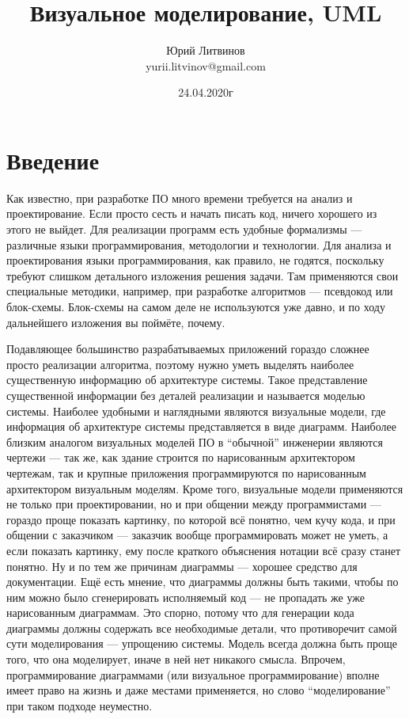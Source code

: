 \documentclass[a5paper]{article}
\title{Визуальное моделирование, UML}
\author{Юрий Литвинов\\\small{yurii.litvinov@gmail.com}}
\date{24.04.2020г}
\begin{document}
\maketitle
\thispagestyle{empty}

\section{Введение}

Как известно, при разработке ПО много времени требуется на анализ и проектирование. Если просто сесть и начать писать код, ничего хорошего из этого не выйдет. Для реализации программ есть удобные формализмы --- различные языки программирования, методологии и технологии. Для анализа и проектирования языки программирования, как правило, не годятся, поскольку требуют слишком детального изложения решения задачи. Там применяются свои специальные методики, например, при разработке алгоритмов --- псевдокод или блок-схемы. Блок-схемы на самом деле не используются уже давно, и по ходу дальнейшего изложения вы поймёте, почему.

Подавляющее большинство разрабатываемых приложений гораздо сложнее просто реализации алгоритма, поэтому нужно уметь выделять наиболее существенную информацию об архитектуре системы. Такое представление существенной информации без деталей реализации и называется моделью системы. Наиболее удобными и наглядными являются визуальные модели, где информация об архитектуре системы представляется в виде диаграмм. Наиболее близким аналогом визуальных моделей ПО в ``обычной'' инженерии являются чертежи --- так же, как здание строится по нарисованным архитектором чертежам, так и крупные приложения программируются по нарисованным архитектором визуальным моделям. Кроме того, визуальные модели применяются не только при проектировании, но и при общении между программистами --- гораздо проще показать картинку, по которой всё понятно, чем кучу кода, и при общении с заказчиком --- заказчик вообще программировать может не уметь, а если показать картинку, ему после краткого объяснения нотации всё сразу станет понятно. Ну и по тем же причинам диаграммы --- хорошее средство для документации. Ещё есть мнение, что диаграммы должны быть такими, чтобы по ним можно было сгенерировать исполняемый код --- не пропадать же уже нарисованным диаграммам. Это спорно, потому что для генерации кода диаграммы должны содержать все необходимые детали, что противоречит самой сути моделирования --- упрощению системы. Модель всегда должна быть проще того, что она моделирует, иначе в ней нет никакого смысла. Впрочем, программирование диаграммами (или визуальное программирование) вполне имеет право на жизнь и даже местами применяется, но слово ``моделирование'' при таком подходе неуместно.
\end{document}

